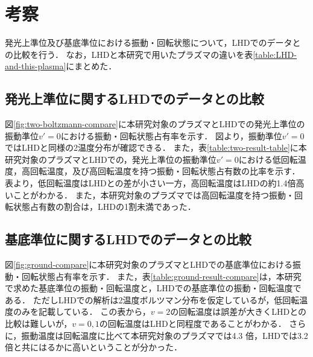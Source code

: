 \chapter{考察}
発光上準位及び基底準位における振動・回転状態について，LHDでのデータとの比較を行う．
なお，LHDと本研究で用いたプラズマの違いを表\ref{table:LHD-and-this-plasma}にまとめた\cite{ishihara}．

\section{発光上準位に関するLHDでのデータとの比較}
図\ref{fig:two-boltzmann-compare}に本研究対象のプラズマとLHDでの発光上準位の振動準位$v'=0$における振動・回転状態占有率を示す．
図より，振動準位$v'=0$ではLHDと同様の2温度分布が確認できる．
また，表\ref{table:two-result-table}に本研究対象のプラズマとLHDでの，発光上準位の振動準位$v'=0$における低回転温度，高回転温度，及び高回転温度を持つ振動・回転状態占有数の比率を示す．
表より，低回転温度はLHDとの差が小さい一方，高回転温度はLHDの約1.4倍高いことがわかる．
また，本研究対象のプラズマでは高回転温度を持つ振動・回転状態占有数の割合は，LHDの1割未満であった．

\section{基底準位に関するLHDでのデータとの比較}
図\ref{fig:ground-compare}に本研究対象のプラズマとLHDでの基底準位における振動・回転状態占有率を示す．
また，表\ref{table:ground-result-compare}は，本研究で求めた基底準位の振動・回転温度と，LHDでの基底準位の振動・回転温度\cite{ishihara}である．
ただしLHDでの解析は2温度ボルツマン分布を仮定しているが，低回転温度のみを記載している．
この表から，$v=2$の回転温度は誤差が大きくLHDとの比較は難しいが，$v=0,1$の回転温度はLHDと同程度であることがわかる．
さらに，振動温度は回転温度に比べて本研究対象のプラズマでは4.3 倍，LHDでは3.2 倍と共にはるかに高いということが分かった．
